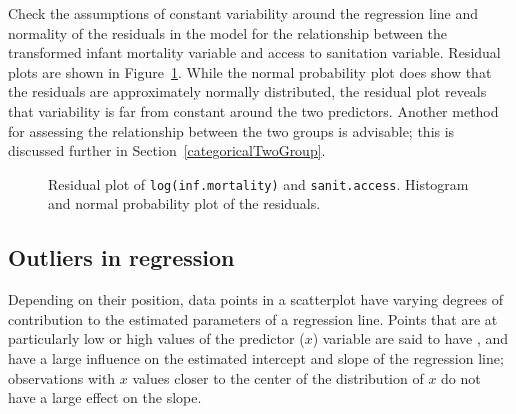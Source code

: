 \begin{examplewrap}
\begin{nexample}{Check the assumptions of constant variability around the regression line and normality of the residuals in the model for the relationship between the transformed infant mortality variable and access to sanitation variable. Residual plots are shown in Figure~\ref{wdiResid}.}\label{wdiAssumptionsEx}%
While the normal probability plot does show that the residuals are approximately normally distributed, the residual plot reveals that variability is far from constant around the two predictors. Another method for assessing the relationship between the two groups is advisable; this is discussed further in Section~\ref{categoricalTwoGroup}.
\end{nexample}
\end{examplewrap}

\begin{figure}[h]
	\centering
	\caption{ Residual plot of \texttt{log(inf.mortality)} and \texttt{sanit.access}.  Histogram and normal probability plot of the residuals.}
	\label{wdiResid}
\end{figure}


\subsection{Outliers in regression}

Depending on their position, data points in a scatterplot have varying degrees of contribution to the estimated parameters of a regression line. Points that are at particularly low or high values of the predictor ($x$) variable are said to have , and have a large influence on the estimated intercept and slope of the regression line; observations with $x$ values closer to the center of the distribution of $x$ do not have a large effect on the slope. 

